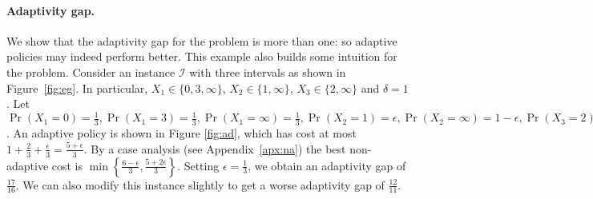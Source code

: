 \documentclass[11pt]{article}
\theoremstyle{remark}
\theoremstyle{plain}
\theoremstyle{remark}
\begin{document}
\paragraph{Adaptivity gap.}  We show that the adaptivity gap for the \smq problem is more than one: so adaptive policies may indeed perform better. This example also builds some intuition for the problem. 
Consider an instance $\mathcal{I}$ with   three intervals as shown in Figure~\ref{fig:eg}. In particular, $X_1 \in \{0, 3, \infty\} $, $X_2 \in \{1, \infty\} $, $X_3 \in \{2,  \infty\} $ and $\delta = 1$. Let  $\Pr(X_1 = 0) = \frac{1}{3}, \Pr(X_1 = 3) = \frac{1}{3}, \Pr(X_1 = \infty) = \frac{1}{3}, \Pr(X_2 = 1  ) = \epsilon,  \Pr(X_2 = \infty  ) = 1- \epsilon,  \Pr(X_3 = 2  ) = 1 - \epsilon, \Pr(X_3 = \infty) = \epsilon$. An adaptive policy is shown in Figure \ref{fig:ad}, which has cost at most $1 + \frac{2}{3} + \frac{ \epsilon}{3} = \frac{5+\epsilon}{3}$. By a case analysis (see Appendix~\ref{apx:na}) the best non-adaptive cost is $\min\left\{ \frac{6-\epsilon}{3} , \frac{5+2\epsilon}{3}\right\}$. Setting $\epsilon=\frac13$, we obtain  an adaptivity gap of $\frac{17}{16}$. We can also modify this instance slightly to get a worse adaptivity gap of   $\frac{12}{11}$. 
\end{document}
